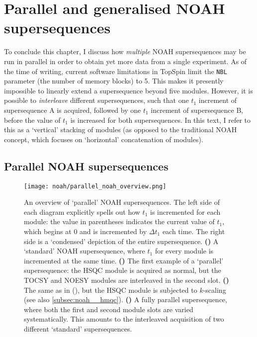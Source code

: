 \section{Parallel and generalised NOAH supersequences}
\label{sec:noah__parallel}

To conclude this chapter, I discuss how \textit{multiple} NOAH supersequences may be run in parallel in order to obtain yet more data from a single experiment.
As of the time of writing, current software limitations in TopSpin limit the \texttt{NBL} parameter (the number of memory blocks) to 5.
This makes it presently impossible to linearly extend a supersequence beyond five modules.
However, it is possible to \textit{interleave} different supersequences, such that one $t_1$ increment of supersequence A is acquired, followed by one $t_1$ increment of supersequence B, before the value of $t_1$ is increased for both supersequences.
In this text, I refer to this as a `vertical' stacking of modules (as opposed to the traditional NOAH concept, which focuses on `horizontal' concatenation of modules).

\subsection{Parallel NOAH supersequences}
\label{sec:noah__parallel_parallel}

\begin{figure}[!htbp]
    \centering
    \texttt{[image: noah/parallel\_noah\_overview.png]}%
    {\label{fig:parallel_noah_overview_conv}}%
    {\label{fig:parallel_noah_overview_interleaved}}%
    {\label{fig:parallel_noah_overview_kscaled}}%
    {\label{fig:parallel_noah_overview_parallel}}%
    \caption[Overview of parallel NOAH supersequences]{
        An overview of `parallel' NOAH supersequences.
        The left side of each diagram explicitly spells out how $t_1$ is incremented for each module: the value in parentheses indicates the current value of $t_1$, which begins at 0 and is incremented by $\Delta t_1$ each time.
        The right side is a `condensed' depiction of the entire supersequence.
        \textbf{()} A `standard' NOAH supersequence, where $t_1$ for every module is incremented at the same time.
        \textbf{()} The first example of a `parallel' supersequence: the HSQC module is acquired as normal, but the TOCSY and NOESY modules are interleaved in the second slot.
        \textbf{()} The same as in (), but the HSQC module is subjected to $k$-scaling (see also \cref{subsec:noah__hmqc}).
        \textbf{()} A fully parallel supersequence, where both the first and second module slots are varied systematically.
        This amounts to the interleaved acquisition of two different `standard' supersequences.
    }
    \label{fig:parallel_noah_overview}
\end{figure}

